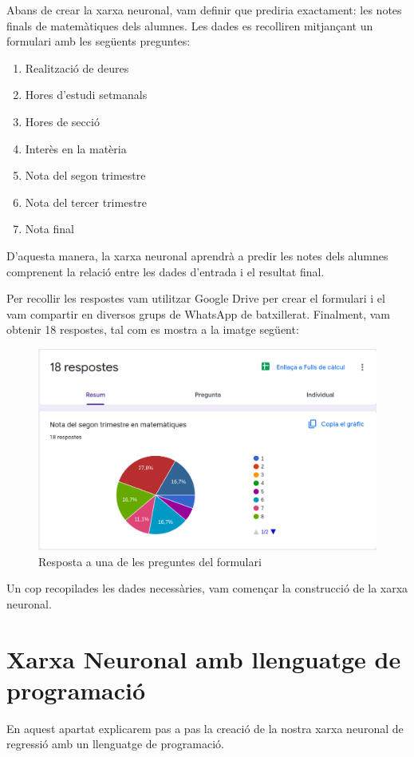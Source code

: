 Abans de crear la xarxa neuronal, vam definir que prediria exactament: les notes finals de matemàtiques dels alumnes. Les dades es recolliren mitjançant un formulari amb les següents preguntes:

\begin{enumerate}
    \item Realització de deures
    \item Hores d’estudi setmanals
    \item Hores de secció
    \item Interès en la matèria
    \item Nota del segon trimestre
    \item Nota del tercer trimestre
    \item Nota final
\end{enumerate}

D’aquesta manera, la xarxa neuronal aprendrà a predir les notes dels alumnes comprenent la relació entre les dades d’entrada i el resultat final.

Per recollir les respostes vam utilitzar Google Drive per crear el formulari i el vam compartir en diversos grups de WhatsApp de batxillerat. Finalment, vam obtenir 18 respostes, tal com es mostra a la imatge següent:

\begin{figure}[h!]
\centering
\includegraphics[width=1\textwidth]{./figures/Formulari.png}
\caption{Resposta a una de les preguntes del formulari}
\end{figure}

Un cop recopilades les dades necessàries, vam començar la construcció de la xarxa neuronal.

\section{Xarxa Neuronal amb llenguatge de programació}\label{sec:10}
En aquest apartat explicarem pas a pas la creació de la nostra xarxa neuronal de regressió amb un llenguatge de programació.

